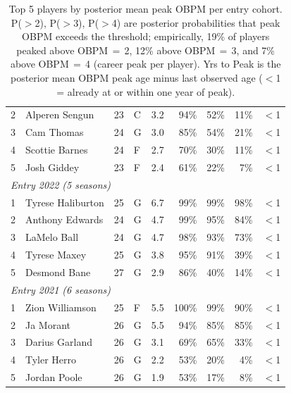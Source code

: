\begin{table}[htbp]
\begin{tabular}{rlrlrrrrr}
    2 & Alperen Sengun & 23 & C & 3.2 & 94\% & 52\% & 11\% & $<$1 \\
    3 & Cam Thomas & 24 & G & 3.0 & 85\% & 54\% & 21\% & $<$1 \\
    4 & Scottie Barnes & 24 & F & 2.7 & 70\% & 30\% & 11\% & $<$1 \\
    5 & Josh Giddey & 23 & F & 2.4 & 61\% & 22\% & 7\% & $<$1 \\
    \midrule[0.4pt]
    \multicolumn{9}{l}{\textit{Entry 2022 (5 seasons)}} \\
    \midrule
    1 & Tyrese Haliburton & 25 & G & 6.7 & 99\% & 99\% & 98\% & $<$1 \\
    2 & Anthony Edwards & 24 & G & 4.7 & 99\% & 95\% & 84\% & $<$1 \\
    3 & LaMelo Ball & 24 & G & 4.7 & 98\% & 93\% & 73\% & $<$1 \\
    4 & Tyrese Maxey & 25 & G & 3.8 & 95\% & 91\% & 39\% & $<$1 \\
    5 & Desmond Bane & 27 & G & 2.9 & 86\% & 40\% & 14\% & $<$1 \\
    \midrule[0.4pt]
    \multicolumn{9}{l}{\textit{Entry 2021 (6 seasons)}} \\
    \midrule
    1 & Zion Williamson & 25 & F & 5.5 & 100\% & 99\% & 90\% & $<$1 \\
    2 & Ja Morant & 26 & G & 5.5 & 94\% & 85\% & 85\% & $<$1 \\
    3 & Darius Garland & 26 & G & 3.1 & 69\% & 65\% & 33\% & $<$1 \\
    4 & Tyler Herro & 26 & G & 2.2 & 53\% & 20\% & 4\% & $<$1 \\
    5 & Jordan Poole & 26 & G & 1.9 & 53\% & 17\% & 8\% & $<$1 \\
    \bottomrule
  \end{tabular}
  \caption{Top 5 players by posterior mean peak OBPM per entry cohort. P($>$2), P($>$3), P($>$4) are posterior probabilities that peak OBPM exceeds the threshold; empirically, 19\% of players peaked above OBPM\,$=$\,2, 12\% above OBPM\,$=$\,3, and 7\% above OBPM\,$=$\,4 (career peak per player). Yrs to Peak is the posterior mean OBPM peak age minus last observed age ($<$1 = already at or within one year of peak).}
  \label{tab:breakout_cohort}
\end{table}


